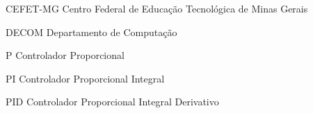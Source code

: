 %
%

\begin{siglas}
	\item[CEFET-MG] Centro Federal de Educação Tecnológica de Minas Gerais
    \item[DECOM] Departamento de Computação
	\item[P] Controlador Proporcional
	\item[PI] Controlador Proporcional Integral	
	\item[PID] Controlador Proporcional Integral Derivativo
\end{siglas}
